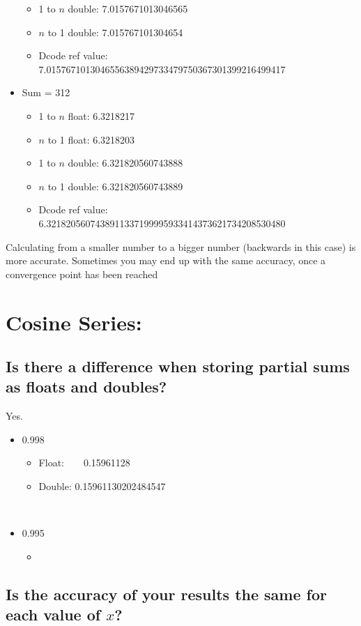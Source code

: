 \documentclass[12pt]{article}
\begin{document}
\begin{itemize}
\begin{itemize}
\item 1 to $n$ double: 7.0157671013046565
\item $n$ to 1 double: 7.015767101304654
\\
\item Dcode ref value: 7.0157671013046556389429733479750367301399216499417
\end{itemize}
\item Sum = 312
\begin{itemize}
\item 1 to $n$ float: 6.3218217
\item $n$ to 1 float: 6.3218203
\\
\item 1 to $n$ double: 6.321820560743888
\item $n$ to 1 double: 6.321820560743889
\\
\item Dcode ref value: 6.3218205607438911337199995933414373621734208530480
\end{itemize}
\end{itemize}
\item Calculating from a smaller number to a bigger number (backwards in this case) is more accurate. Sometimes you may end up with the same accuracy, once a convergence point has been reached


\section*{Cosine Series:}

\begin{itemize}
\subsection*{Is there a difference when storing partial sums as floats and doubles?}
\end{itemize}
\item Yes.
\begin{itemize}
\item 0.998
\begin{itemize}
\item Float:\ \ \ \ 0.15961128
\item Double: 0.15961130202484547
\end{itemize}
\\
\item 0.995
\begin{itemize} 
\item 
\end{itemize}
\end{itemize}
\begin{itemize}
\subsection*{Is the accuracy of your results the same for each value of $x$?}
\end{itemize}
\end{document}

